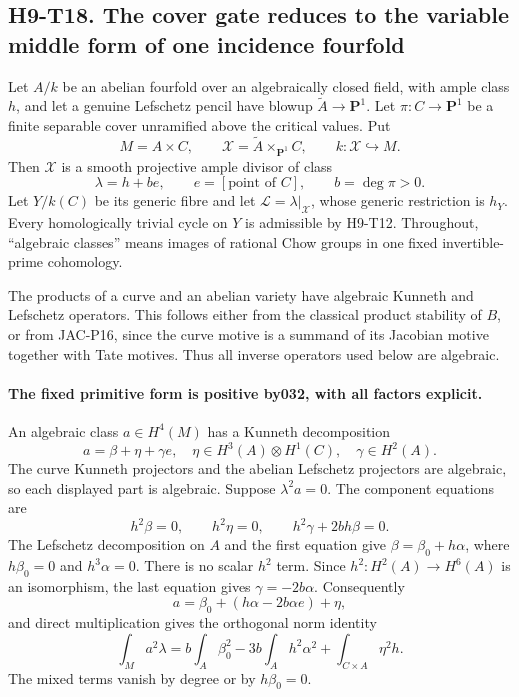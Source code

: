 \documentclass[11pt,a4paper]{article}
\begin{document}

\subsection*{H9-T18. The cover gate reduces to the variable middle form of one incidence fourfold}

Let $A/k$ be an abelian fourfold over an algebraically closed field,
with ample class $h$, and let a genuine Lefschetz pencil have blowup
$\widetilde A\to\mathbf P^1$. Let $\pi:C\to\mathbf P^1$ be a finite
separable cover unramified above the critical values. Put
\[
 M=A\times C,\qquad
 \mathcal X=\widetilde A\times_{\mathbf P^1}C,
 \qquad k:\mathcal X\hookrightarrow M.
\]
Then $\mathcal X$ is a smooth projective ample divisor of class
\[
 \lambda=h+b e,\qquad e=[\text{point of }C],\qquad b=\deg\pi>0.
\]
Let $Y/k(C)$ be its generic fibre and let
$\mathcal L=\lambda|_{\mathcal X}$, whose generic restriction is
$h_Y$. Every homologically trivial cycle on $Y$ is admissible by
H9-T12. Throughout, ``algebraic classes'' means images of rational
Chow groups in one fixed invertible-prime cohomology.

The products of a curve and an abelian variety have algebraic
Kunneth and Lefschetz operators. This follows either from the
classical product stability of $B$, or from JAC-P16, since the
curve motive is a summand of its Jacobian motive together with
Tate motives. Thus all inverse operators used below are algebraic.

\paragraph{The fixed primitive form is positive by032, with all factors explicit.}
An algebraic class $a\in H^4(M)$ has a Kunneth decomposition
\[
                 a=\beta+\eta+\gamma e,
 \quad\eta\in H^3(A)\otimes H^1(C),\quad\gamma\in H^2(A).
\]
The curve Kunneth projectors and the abelian Lefschetz projectors
are algebraic, so each displayed part is algebraic. Suppose
$\lambda^2a=0$. The component equations are
\[
 h^2\beta=0,\qquad h^2\eta=0,
       \qquad h^2\gamma+2b h\beta=0.
\]
The Lefschetz decomposition on $A$ and the first equation give
$\beta=\beta_0+h\alpha$, where $h\beta_0=0$ and $h^3\alpha=0$.
There is no scalar $h^2$ term. Since
$h^2:H^2(A)\to H^6(A)$ is an isomorphism, the last equation gives
$\gamma=-2b\alpha$. Consequently
\[
 a=\beta_0+(h\alpha-2b\alpha e)+\eta,
\]
and direct multiplication gives the orthogonal norm identity
\[
 \int_M a^2\lambda
   =b\int_A\beta_0^2
       -3b\int_Ah^2\alpha^2
       +\int_{C\times A}\eta^2h.                          \tag{H9.86}
\]
The mixed terms vanish by degree or by $h\beta_0=0$.
\end{document}

